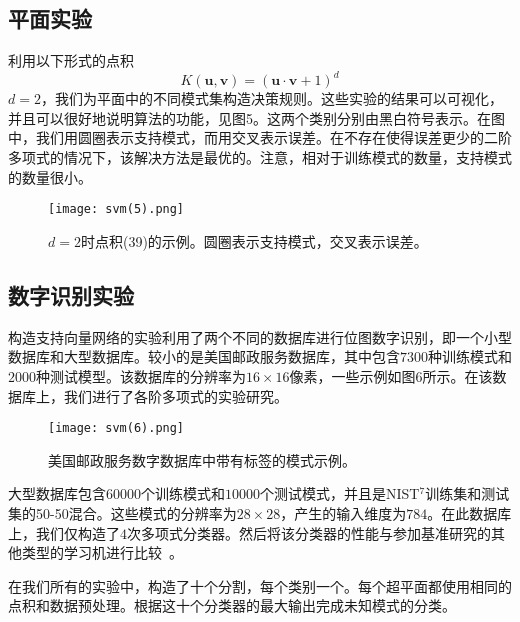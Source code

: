 \documentclass[lang=cn,11pt,a4paper]{elegantpaper}
\newcommand{\upcite}[1]{\textsuperscript{\textsuperscript{\cite{#1}}}}
\begin{document}
	\subsection{平面实验}
	利用以下形式的点积
	\begin{equation}
		K(\mathbf{u},\mathbf{v})=(\mathbf{u}·\mathbf{v}+1)^d \tag{39}
	\end{equation}
	$d=2$，我们为平面中的不同模式集构造决策规则。这些实验的结果可以可视化，并且可以很好地说明算法的功能，见图5。这两个类别分别由黑白符号表示。在图中，我们用圆圈表示支持模式，而用交叉表示误差。在不存在使得误差更少的二阶多项式的情况下，该解决方法是最优的。注意，相对于训练模式的数量，支持模式的数量很小。
	\begin{figure}[htbp]
		\centering
		\texttt{[image: svm(5).png]}
		\caption{$d=2$时点积(39)的示例。圆圈表示支持模式，交叉表示误差。}
	\end{figure}

	\subsection{数字识别实验}
	构造支持向量网络的实验利用了两个不同的数据库进行位图数字识别，即一个小型数据库和大型数据库。较小的是美国邮政服务数据库，其中包含$7300$种训练模式和$2000$种测试模型。该数据库的分辨率为$16\times16$像素，一些示例如图6所示。在该数据库上，我们进行了各阶多项式的实验研究。
	\begin{figure}[htbp]
		\centering
		\texttt{[image: svm(6).png]}
		\caption{美国邮政服务数字数据库中带有标签的模式示例。}
	\end{figure}
	大型数据库包含$60000$个训练模式和$10000$个测试模式，并且是NIST$^7$训练集和测试集的50-50混合。这些模式的分辨率为$28\times28$，产生的输入维度为$784$。在此数据库上，我们仅构造了$4$次多项式分类器。然后将该分类器的性能与参加基准研究的其他类型的学习机进行比较~\upcite{bottou1994comparison}。

	在我们所有的实验中，构造了十个分割，每个类别一个。每个超平面都使用相同的点积和数据预处理。根据这十个分类器的最大输出完成未知模式的分类。
\end{document}
